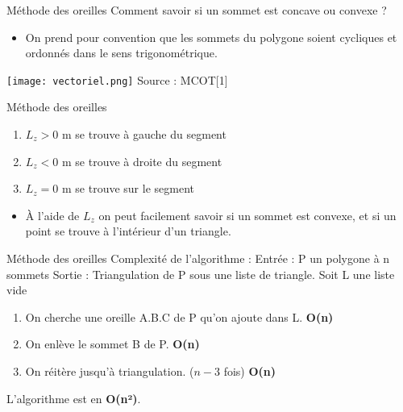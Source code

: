 \documentclass{beamer}
\begin{document}
\begin{frame}{Méthode des oreilles}
    Comment savoir si un sommet est concave ou convexe ? \newline
    \begin{itemize}
        \item  On prend pour convention que les sommets du polygone soient cycliques et ordonnés dans le sens trigonométrique.
    \end{itemize}
   \newline    
    \begin{center}
        \texttt{[image: vectoriel.png]}
        Source : MCOT[1]
    \end{center}
\end{frame}
\begin{frame}{Méthode des oreilles}
    \begin{center}
        \begin{enumerate}
            \item $L_z > 0$ m se trouve à gauche du segment
            \item $L_z < 0$ m se trouve à droite du segment
            \item $L_z = 0$ m se trouve sur le segment \newline\newline
        \end{enumerate}
        \begin{itemize}
            \item À l'aide de $L_z$ on peut facilement savoir si un sommet est convexe, et si un point se trouve à l'intérieur d'un triangle.
        \end{itemize}
    \end{center}
\end{frame}
\begin{frame}{Méthode des oreilles}
    Complexité de l'algorithme : \newline\newline
    Entrée : P un polygone à n sommets \newline\newline
    Sortie : Triangulation de P sous une liste de triangle. \newline\newline
    Soit L une liste vide 
    \begin{enumerate}
        \item On cherche une oreille A.B.C  de P qu'on ajoute dans L. \textbf{O(n)}
        \item On enlève le sommet B de P. \textbf{O(n)}
        \item On réitère jusqu'à triangulation. ($n-3$ fois)  \textbf{O(n)} \newline\newline
    \end{enumerate}
    \begin{center}
        L'algorithme est en \textbf{O(n²)}.
    \end{center}
\end{frame}
\end{document}
